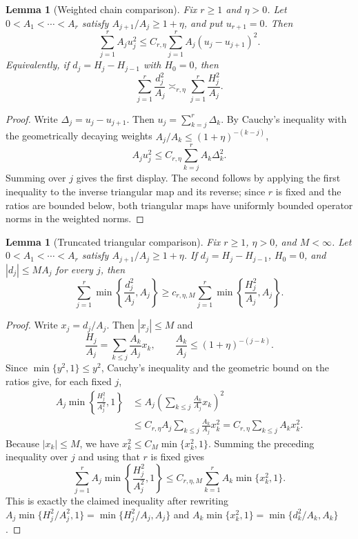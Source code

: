 \documentclass[11pt]{article}
\newtheorem{lemma}[theorem]{Lemma}
\theoremstyle{remark}
\begin{document}
\begin{lemma}[Weighted chain comparison]\label{lem:weighted-chain-comparison}
Fix $r\ge1$ and $\eta>0$.  Let
$0<A_1<\cdots<A_r$ satisfy $A_{j+1}/A_j\ge1+\eta$, and put
$u_{r+1}=0$.  Then
\[
        \sum_{j=1}^r A_j u_j^2
        \le C_{r,\eta}\sum_{j=1}^r A_j(u_j-u_{j+1})^2 .
\]
Equivalently, if $d_j=H_j-H_{j-1}$ with $H_0=0$, then
\[
        \sum_{j=1}^r \frac{d_j^2}{A_j}
        \asymp_{r,\eta}
        \sum_{j=1}^r \frac{H_j^2}{A_j} .
\]
\end{lemma}

\begin{proof}
Write $\Delta_j=u_j-u_{j+1}$.  Then $u_j=\sum_{k=j}^r\Delta_k$.  By Cauchy's inequality with the geometrically decaying weights $A_j/A_k\le(1+\eta)^{-(k-j)}$,
\[
        A_j u_j^2
        \le C_{r,\eta}\sum_{k=j}^r A_k\Delta_k^2 .
\]
Summing over $j$ gives the first display.  The second follows by applying the first inequality to the inverse triangular map and its reverse; since $r$ is fixed and the ratios are bounded below, both triangular maps have uniformly bounded operator norms in the weighted norms.
\end{proof}

\begin{lemma}[Truncated triangular comparison]\label{lem:truncated-triangular-comparison}
Fix $r\ge1$, $\eta>0$, and $M<\infty$.  Let
$0<A_1<\cdots<A_r$ satisfy $A_{j+1}/A_j\ge1+\eta$.  If
$d_j=H_j-H_{j-1}$, $H_0=0$, and $|d_j|\le M A_j$ for every $j$, then
\[
        \sum_{j=1}^r
        \min\left\{\frac{d_j^2}{A_j},A_j\right\}
        \ge c_{r,\eta,M}
        \sum_{j=1}^r
        \min\left\{\frac{H_j^2}{A_j},A_j\right\}.
\]
\end{lemma}

\begin{proof}
Write $x_j=d_j/A_j$.  Then $|x_j|\le M$ and
\[
        \frac{H_j}{A_j}=\sum_{k\le j}\frac{A_k}{A_j}x_k,
        \qquad
        \frac{A_k}{A_j}\le (1+\eta)^{-(j-k)} .
\]
Since $\min\{y^2,1\}\le y^2$, Cauchy's inequality and the geometric
bound on the ratios give, for each fixed $j$,
\[
\begin{aligned}
        A_j\min\left\{\frac{H_j^2}{A_j^2},1\right\}
        &\le A_j\left(\sum_{k\le j}\frac{A_k}{A_j}x_k\right)^2  \\
        &\le C_{r,\eta} A_j\sum_{k\le j}\frac{A_k}{A_j}x_k^2
         = C_{r,\eta}\sum_{k\le j} A_k x_k^2 .
\end{aligned}
\]
Because $|x_k|\le M$, we have
$x_k^2\le C_M\min\{x_k^2,1\}$.  Summing the preceding inequality over
$j$ and using that $r$ is fixed gives
\[
        \sum_{j=1}^r A_j
        \min\left\{\frac{H_j^2}{A_j^2},1\right\}
        \le C_{r,\eta,M}
        \sum_{k=1}^r A_k\min\{x_k^2,1\}.
\]
This is exactly the claimed inequality after rewriting
$A_j\min\{H_j^2/A_j^2,1\}=\min\{H_j^2/A_j,A_j\}$ and
$A_k\min\{x_k^2,1\}=\min\{d_k^2/A_k,A_k\}$.
\end{proof}
\end{document}
